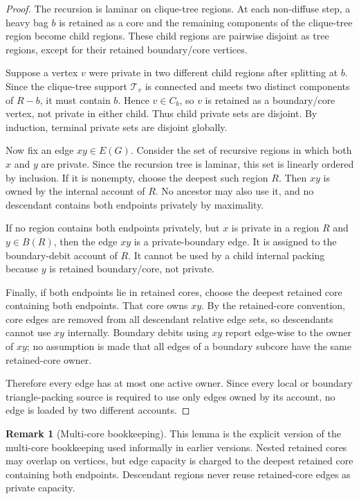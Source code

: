 \documentclass[11pt]{article}
\theoremstyle{definition}
\newtheorem{remark}[theorem]{Remark}
\newcommand{\calT}{\mathcal T}
\begin{document}
\begin{proof}
The recursion is laminar on clique-tree regions. At each non-diffuse step, a heavy bag \(b\) is retained as a core and the remaining components of the clique-tree region become child regions. These child regions are pairwise disjoint as tree regions, except for their retained boundary/core vertices.

Suppose a vertex \(v\) were private in two different child regions after splitting at \(b\). Since the clique-tree support \(\calT_v\) is connected and meets two distinct components of \(R-b\), it must contain \(b\). Hence \(v\in C_b\), so \(v\) is retained as a boundary/core vertex, not private in either child. Thus child private sets are disjoint. By induction, terminal private sets are disjoint globally.

Now fix an edge \(xy\in E(G)\). Consider the set of recursive regions in which both \(x\) and \(y\) are private. Since the recursion tree is laminar, this set is linearly ordered by inclusion. If it is nonempty, choose the deepest such region \(R\). Then \(xy\) is owned by the internal account of \(R\). No ancestor may also use it, and no descendant contains both endpoints privately by maximality.

If no region contains both endpoints privately, but \(x\) is private in a region \(R\) and \(y\in B(R)\), then the edge \(xy\) is a private-boundary edge. It is assigned to the boundary-debit account of \(R\). It cannot be used by a child internal packing because \(y\) is retained boundary/core, not private.

Finally, if both endpoints lie in retained cores, choose the deepest retained core containing both endpoints. That core owns \(xy\). By the retained-core convention, core edges are removed from all descendant relative edge sets, so descendants cannot use \(xy\) internally. Boundary debits using \(xy\) report edge-wise to the owner of \(xy\); no assumption is made that all edges of a boundary subcore have the same retained-core owner.

Therefore every edge has at most one active owner. Since every local or boundary triangle-packing source is required to use only edges owned by its account, no edge is loaded by two different accounts.
\end{proof}

\begin{remark}[Multi-core bookkeeping]
This lemma is the explicit version of the multi-core bookkeeping used informally in earlier versions. Nested retained cores may overlap on vertices, but edge capacity is charged to the deepest retained core containing both endpoints. Descendant regions never reuse retained-core edges as private capacity.
\end{remark}
\end{document}

